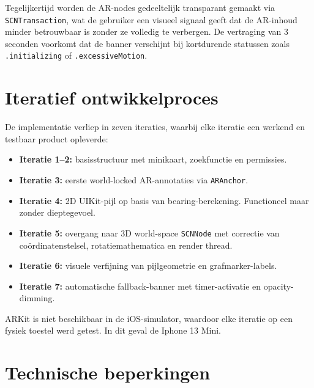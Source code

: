 Tegelijkertijd worden de AR-nodes gedeeltelijk transparant gemaakt via \texttt{SCNTransaction}, wat de gebruiker een visueel signaal geeft dat de AR-inhoud minder betrouwbaar is zonder ze volledig te verbergen. De vertraging van 3 seconden voorkomt dat de banner verschijnt bij kortdurende statussen zoals \texttt{.initializing} of \texttt{.excessiveMotion}.

\section{Iteratief ontwikkelproces}

De implementatie verliep in zeven iteraties, waarbij elke iteratie een werkend en testbaar product opleverde:

\begin{itemize}
    \item \textbf{Iteratie 1--2:} basisstructuur met minikaart, zoekfunctie en permissies.
    \item \textbf{Iteratie 3:} eerste world-locked AR-annotaties via \texttt{ARAnchor}.
    \item \textbf{Iteratie 4:} 2D UIKit-pijl op basis van bearing-berekening. Functioneel maar zonder dieptegevoel.
    \item \textbf{Iteratie 5:} overgang naar 3D world-space \texttt{SCNNode} met correctie van coördinatenstelsel, rotatiemathematica en render thread.
    \item \textbf{Iteratie 6:} visuele verfijning van pijlgeometrie en grafmarker-labels.
    \item \textbf{Iteratie 7:} automatische fallback-banner met timer-activatie en opacity-dimming.
\end{itemize}

ARKit is niet beschikbaar in de iOS-simulator, waardoor elke iteratie op een fysiek toestel werd getest. In dit geval de Iphone 13 Mini.

\section{Technische beperkingen}

